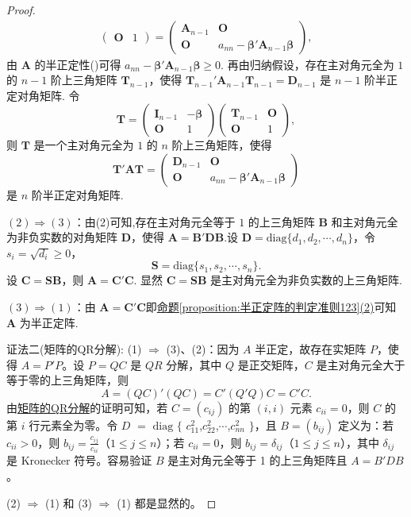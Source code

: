 \documentclass[../../main.tex]{subfiles}
\begin{document}
\begin{proof}
\begin{align*}
\begin{pmatrix}
\boldsymbol{O} & 1
\end{pmatrix}=
\begin{pmatrix}
\boldsymbol{A}_{n - 1} & \boldsymbol{O} \\
\boldsymbol{O} & a_{nn}-\boldsymbol{\beta}'\boldsymbol{A}_{n - 1}\boldsymbol{\beta}
\end{pmatrix},
\end{align*}
由 $\boldsymbol{A}$ 的半正定性()可得 $a_{nn}-\boldsymbol{\beta}'\boldsymbol{A}_{n - 1}\boldsymbol{\beta}\geq0$. 再由归纳假设，存在主对角元全为 $1$ 的 $n - 1$ 阶上三角矩阵 $\boldsymbol{T}_{n - 1}$，使得 $\boldsymbol{T}_{n - 1}'\boldsymbol{A}_{n - 1}\boldsymbol{T}_{n - 1}=\boldsymbol{D}_{n - 1}$ 是 $n - 1$ 阶半正定对角矩阵. 令
\[
\boldsymbol{T}=\begin{pmatrix}
\boldsymbol{I}_{n - 1} & -\boldsymbol{\beta} \\
\boldsymbol{O} & 1
\end{pmatrix}
\begin{pmatrix}
\boldsymbol{T}_{n - 1} & \boldsymbol{O} \\
\boldsymbol{O} & 1
\end{pmatrix},
\]
则 $\boldsymbol{T}$ 是一个主对角元全为 $1$ 的 $n$ 阶上三角矩阵，使得
\[
\boldsymbol{T}'\boldsymbol{A}\boldsymbol{T}=\begin{pmatrix}
\boldsymbol{D}_{n - 1} & \boldsymbol{O} \\
\boldsymbol{O} & a_{nn}-\boldsymbol{\beta}'\boldsymbol{A}_{n - 1}\boldsymbol{\beta}
\end{pmatrix}
\]
是 $n$ 阶半正定对角矩阵.

$(2)\Rightarrow(3)$：由(2)可知,存在主对角元全等于 $1$ 的上三角矩阵 $\boldsymbol{B}$ 和主对角元全为非负实数的对角矩阵 $\boldsymbol{D}$，使得 $\boldsymbol{A}=\boldsymbol{B}'\boldsymbol{D}\boldsymbol{B}$.设 $\boldsymbol{D}=\mathrm{diag}\{d_1,d_2,\cdots,d_n\}$，令 $s_i = \sqrt{d_i}\geq0$，
\[
\boldsymbol{S}=\mathrm{diag}\{s_1,s_2,\cdots,s_n\}.
\]
设 $\boldsymbol{C}=\boldsymbol{S}\boldsymbol{B}$，则 $\boldsymbol{A}=\boldsymbol{C}'\boldsymbol{C}$. 显然 $\boldsymbol{C}=\boldsymbol{S}\boldsymbol{B}$ 是主对角元全为非负实数的上三角矩阵.

$(3)\Rightarrow(1)$：由 $\boldsymbol{A}=\boldsymbol{C}'\boldsymbol{C}$即\hyperref[proposition:半正定阵的判定准则123]{命题\ref{proposition:半正定阵的判定准则123}(2)}可知 $\boldsymbol{A}$ 为半正定阵.

{\color{blue}证法二(矩阵的QR分解):}
(1) $\Rightarrow$ (3)、(2)：因为 $A$ 半正定，故存在实矩阵 $P$，使得 $A = P'P$。设 $P = QC$ 是 $QR$ 分解，其中 $Q$ 是正交矩阵，$C$ 是主对角元全大于等于零的上三角矩阵，则
\[
A=(QC)'(QC)=C'(Q'Q)C = C'C.
\]
由\hyperref[theorem:矩阵的QR分解]{矩阵的QR分解}的证明可知，若 $C = (c_{ij})$ 的第 $(i,i)$ 元素 $c_{ii}=0$，则 $C$ 的第 $i$ 行元素全为零。令 $D$ $=$ $\mathrm{diag}$ $\{$ $c_{11}^2$,$c_{22}^2$,$\cdots$,$c_{nn}^2$ $\}$，且 $B = (b_{ij})$ 定义为：若 $c_{ii}>0$，则 $b_{ij}=\frac{c_{ij}}{c_{ii}}$（$1\leq j\leq n$）；若 $c_{ii}=0$，则 $b_{ij}=\delta_{ij}$（$1\leq j\leq n$），其中 $\delta_{ij}$ 是 Kronecker 符号。容易验证 $B$ 是主对角元全等于 1 的上三角矩阵且 $A = B'DB$。

(2) $\Rightarrow$ (1) 和 (3) $\Rightarrow$ (1) 都是显然的。 
\end{proof}
\end{document}
